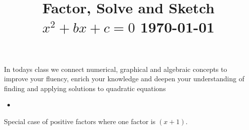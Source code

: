 \documentclass[12pt, a4paper, addpoints]{exam}
\title{Factor, Solve and Sketch  $x^2+bx+c=0$ \dayofweekname{\day}{\month}{\year} \today}
\date{}
\newcommand{\ms}{\vspace{33 mm}}
\begin{document}
\maketitle

\vspace{-18mm}
\noindent 
In todays class we connect  numerical, graphical and algebraic concepts to improve your fluency, enrich  your knowledge and deepen your understanding of finding and applying solutions to quadratic equations
\begin{questions}



\begin{mdframed}[backgroundcolor=gray!10] %
\scriptsize
\setlength{\columnsep}{2pt}
\begin{multicols}{4}
\begin{itemize}
\item  
\end{itemize}
\end{multicols}



\end{mdframed}





\question Special  case  of  positive factors where one factor  is \((x+1) \).


\begin{parts}\Large
{} \ms
\end{parts}


\end{questions}
\end{document}
